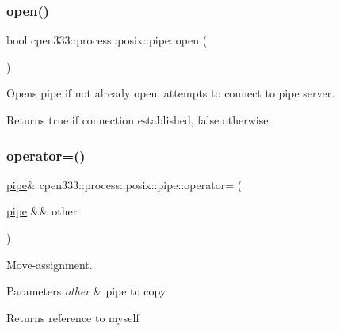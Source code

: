 \subsubsection{\texorpdfstring{open()}{open()}}
{\footnotesize\ttfamily bool cpen333\+::process\+::posix\+::pipe\+::open (\begin{DoxyParamCaption}{ }\end{DoxyParamCaption})\hspace{0.3cm}{\ttfamily [inline]}}



Opens pipe if not already open, attempts to connect to pipe server. 

\begin{DoxyReturn}{Returns}
true if connection established, false otherwise 
\end{DoxyReturn}
\mbox{\label{classcpen333_1_1process_1_1posix_1_1pipe_ab0715b21ad951bff7da956bfe71c51d7}} 
\subsubsection{\texorpdfstring{operator=()}{operator=()}}
{\footnotesize\ttfamily \hyperlink{classcpen333_1_1process_1_1posix_1_1pipe}{pipe}\& cpen333\+::process\+::posix\+::pipe\+::operator= (\begin{DoxyParamCaption}\item[{\hyperlink{classcpen333_1_1process_1_1posix_1_1pipe}{pipe} \&\&}]{other }\end{DoxyParamCaption})\hspace{0.3cm}{\ttfamily [inline]}}



Move-\/assignment. 


\begin{DoxyParams}{Parameters}
{\em other} & pipe to copy \\
\hline
\end{DoxyParams}
\begin{DoxyReturn}{Returns}
reference to myself 
\end{DoxyReturn}
\mbox{\label{classcpen333_1_1process_1_1posix_1_1pipe_af327b2c4db0cfd21cd5688ccff0f5eb0}} 
